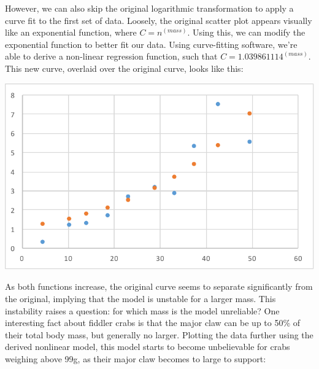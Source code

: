 \documentclass[10pt,letterpaper]{article}
\begin{document}
			However, we can also skip the original logarithmic transformation to apply a curve fit to the first set of data. Loosely, the original scatter plot appears visually like an exponential function, where $C = n^{(mass)}$. Using this, we can modify the exponential function to better fit our data. Using curve-fitting software, we're able to derive a non-linear regression function, such that $C = 1.039861114^{(mass)}$. This new curve, overlaid over the original curve, looks like this:
			\newline \newline
			\centerline{\includegraphics{Picture12.pdf}}
			\newline \newline
			As both functions increase, the original curve seems to separate significantly from the original, implying that the model is unstable for a larger mass.
			\newline \newline
			This instability raises a question: for which mass is the model unreliable? One interesting fact about fiddler crabs is that the major claw can be up to 50\% of their total body mass, but generally no larger. Plotting the data further using the derived nonlinear model, this model starts to become unbelievable for crabs weighing above 99g, as their major claw becomes to large to support:
\end{document}
